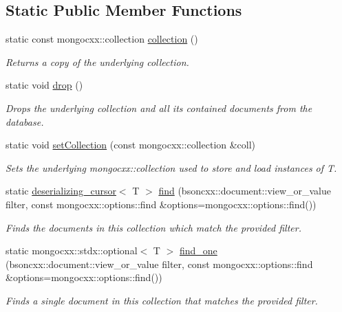 \subsection*{Static Public Member Functions}
\begin{DoxyCompactItemize}
\item 
static const mongocxx\+::collection \hyperlink{classmongo__odm_1_1model_a889659470cbceaa2f9134ff383171e48}{collection} ()
\begin{DoxyCompactList}\small\item\em Returns a copy of the underlying collection. \end{DoxyCompactList}\item 
static void \hyperlink{classmongo__odm_1_1model_af47852c3aa1b8a9e5c07fa96c8530401}{drop} ()
\begin{DoxyCompactList}\small\item\em Drops the underlying collection and all its contained documents from the database. \end{DoxyCompactList}\item 
static void \hyperlink{classmongo__odm_1_1model_abff58cf53410faa6e0fe3ef820ca1612}{set\+Collection} (const mongocxx\+::collection \&coll)
\begin{DoxyCompactList}\small\item\em Sets the underlying mongocxx\+::collection used to store and load instances of T. \end{DoxyCompactList}\item 
static \hyperlink{classmongo__odm_1_1deserializing__cursor}{deserializing\+\_\+cursor}$<$ T $>$ \hyperlink{classmongo__odm_1_1model_a82419c85a1aa7de0de1c1202d4fafa2f}{find} (bsoncxx\+::document\+::view\+\_\+or\+\_\+value filter, const mongocxx\+::options\+::find \&options=mongocxx\+::options\+::find())
\begin{DoxyCompactList}\small\item\em Finds the documents in this collection which match the provided filter. \end{DoxyCompactList}\item 
static mongocxx\+::stdx\+::optional$<$ T $>$ \hyperlink{classmongo__odm_1_1model_a34b44af2a382b63b33e88dfb092e747c}{find\+\_\+one} (bsoncxx\+::document\+::view\+\_\+or\+\_\+value filter, const mongocxx\+::options\+::find \&options=mongocxx\+::options\+::find())
\begin{DoxyCompactList}\small\item\em Finds a single document in this collection that matches the provided filter. \end{DoxyCompactList}\end{DoxyCompactItemize}


